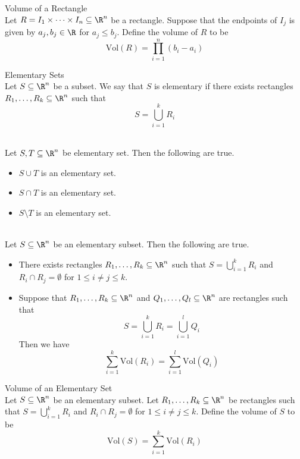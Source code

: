 \documentclass[a4paper]{article}
\begin{document}
\begin{defn}{Volume of a Rectangle}{}\\
Let $R=I_1\times\cdots\times I_n\subseteq\R^n$ be a rectangle. Suppose that the endpoints of $I_j$ is given by $a_j,b_j\in\R$ for $a_j\leq b_j$. Define the volume of $R$ to be $$\text{Vol}(R)=\prod_{i=1}^n(b_i-a_i)$$
\end{defn}

\begin{defn}{Elementary Sets}{}\\
Let $S\subseteq\R^n$ be a subset. We say that $S$ is elementary if there exists rectangles $R_1,\dots,R_k\subseteq\R^n$ such that $$S=\bigcup_{i=1}^kR_i$$
\end{defn}

\begin{lmm}{}{}\\
Let $S,T\subseteq\R^n$ be elementary set. Then the following are true. 
\begin{itemize}
\item $S\cup T$ is an elementary set. 
\item $S\cap T$ is an elementary set. 
\item $S\setminus T$ is an elementary set. 
\end{itemize}
\end{lmm}

\begin{prp}{}{}\\
Let $S\subseteq\R^n$ be an elementary subset. Then the following are true. 
\begin{itemize}
\item There exists rectangles $R_1,\dots,R_k\subseteq\R^n$ such that $S=\bigcup_{i=1}^kR_i$ and $R_i\cap R_j=\emptyset$ for $1\leq i\neq j\leq k$. 
\item Suppose that $R_1,\dots,R_k\subseteq\R^n$ and $Q_1,\dots,Q_l\subseteq\R^n$ are rectangles such that $$S=\bigcup_{i=1}^kR_i=\bigcup_{i=1}^lQ_i$$ Then we have $$\sum_{i=1}^k\text{Vol}(R_i)=\sum_{i=1}^l\text{Vol}(Q_i)$$
\end{itemize}
\end{prp}

\begin{defn}{Volume of an Elementary Set}{}\\
Let $S\subseteq\R^n$ be an elementary subset. Let $R_1,\dots,R_k\subseteq\R^n$ be rectangles such that $S=\bigcup_{i=1}^kR_i$ and $R_i\cap R_j=\emptyset$ for $1\leq i\neq j\leq k$. Define the volume of $S$ to be $$\text{Vol}(S)=\sum_{i=1}^k\text{Vol}(R_i)$$
\end{defn}
\end{document}
